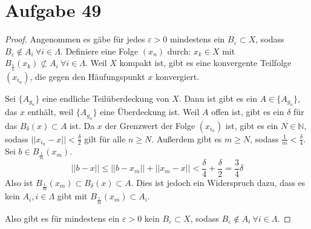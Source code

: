 \documentclass[10pt,a4paper]{article}
\begin{document}
\section{Aufgabe 49}

\begin{proof}
  Angenommen es gäbe für jedes $\varepsilon > 0$ mindestens ein $B_{\varepsilon} \subset X$, sodass $B_{\varepsilon} \notin A_{i}\ \forall i \in \Lambda$.
  Definiere eine Folge $(x_{n})$ durch: $x_{k} \in X$ mit $B_{\frac{1}{k}}(x_{k}) \not\subset A_{i}\ \forall i \in \Lambda$.
  Weil $X$ kompakt ist, gibt es eine konvergente Teilfolge $(x_{i_{n}})$, die gegen den Häufungspunkt $x$ konvergiert.

  Sei $\{ A_{g_{n}} \}$ eine endliche Teilüberdeckung von $X$.
  Dann ist gibt es ein $A \in \{ A_{g_{n}} \}$, das $x$ enthält, weil $\{ A_{g_{n}} \}$ eine Überdeckung ist.
  Weil $A$ offen ist, gibt es ein $\delta$ für das $B_{\delta}(x) \subset A$ ist.
  Da $x$ der Grenzwert der Folge $(x_{i_{n}})$ ist, gibt es ein $N \in \mathbb{N}$, sodass $||x_{i_{n}} - x|| < \frac{\delta}{2}$ gilt für alle $n \ge N$.
  Außerdem gibt es $m \ge N$, sodass $\frac{1}{m} < \frac{\delta}{4}$.
  Sei $b \in B_{\frac{1}{m}}(x_{m})$.
  \begin{equation}
    ||b - x|| \le ||b - x_{m}|| + ||x_{m} - x|| < \frac{\delta}{4} + \frac{\delta}{2} = \frac{3}{4}\delta
  \end{equation}
  Also ist $B_{\frac{1}{m}}(x_{m}) \subset B_{\delta}(x) \subset A$.
  Dies ist jedoch ein Widerspruch dazu, dass es kein $A_{i}, i \in \Lambda$ gibt mit $B_{\frac{1}{m}}(x_{m}) \subset A_{i}$.

  Also gibt es für mindestens ein $\varepsilon > 0$ kein $B_{\varepsilon} \subset X$, sodass $B_{\varepsilon} \notin A_{i}\ \forall i \in \Lambda$.
\end{proof}
\end{document}
